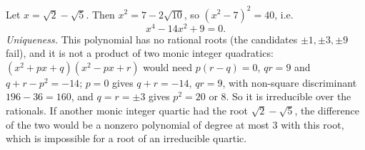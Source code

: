 Let $x=\sqrt2-\sqrt5$. Then $x^2=7-2\sqrt{10}$, so $\left(x^2-7\right)^2=40$, i.e.
\[\boxed{x^4-14x^2+9}=0.\]
\emph{Uniqueness.} This polynomial has no rational roots (the candidates $\pm1,\pm3,\pm9$ fail), and it is not a product of two monic integer quadratics: $\left(x^2+px+q\right)\left(x^2-px+r\right)$ would need $p(r-q)=0$, $qr=9$ and $q+r-p^2=-14$; $p=0$ gives $q+r=-14$, $qr=9$, with non-square discriminant $196-36=160$, and $q=r=\pm3$ gives $p^2=20$ or $8$. So it is irreducible over the rationals. If another monic integer quartic had the root $\sqrt2-\sqrt5$, the difference of the two would be a nonzero polynomial of degree at most $3$ with this root, which is impossible for a root of an irreducible quartic.
